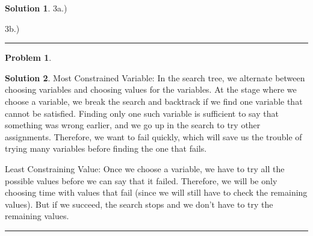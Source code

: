 \documentclass{article}
\theoremstyle{definition}
\newtheorem{problem}{Problem}
\def\fline{\rule{0.75\linewidth}{0.5pt}}
\newcommand{\finishline}{\begin{center}\fline\end{center}}
\newtheorem*{solution*}{Solution}
\newenvironment{solution}{\begin{solution*}}{{\finishline} \end{solution*}}
\begin{document}
\begin{solution}
	\item  3a.) 
		\begin{figure}[h!]
			\centering
		 
		\end{figure}

	\begin{newpage}
	\end{newpage}

	\item 3b.)
		\begin{figure}[h!]
			\centering
		 
		\end{figure}

	
\end{solution}

\begin{problem} %
	

\end{problem}

\begin{solution}
	\item  Most Constrained Variable: In the search tree, we alternate between choosing variables and choosing values for the variables. At the stage where we choose a variable, we break the search and backtrack if we find one variable that cannot be satisfied. Finding only one such variable is sufficient to say that something was wrong earlier, and we go up in the search to try other assignments. Therefore, we want to fail quickly, which will save us the trouble of trying many variables before finding the one that fails.

	\item Least Constraining Value: Once we choose a variable, we have to try all the possible values before we can say that it failed. Therefore, we will be only choosing time with values that fail (since we will still have to check the remaining values). But if we succeed, the search stops and we don't have to try the remaining values. 
	
\end{solution}
\end{document}
